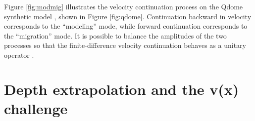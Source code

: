 \par
Figure \ref{fig:modmig} illustrates the velocity continuation process
on the Qdome synthetic model \cite[]{Claerbout.gem.97}, shown in Figure
\ref{fig:qdome}. Continuation backward in velocity corresponds to the
``modeling'' mode, while forward continuation corresponds to the
``migration'' mode. It is possible to balance the amplitudes of the
two processes so that the finite-difference velocity continuation
behaves as a unitary operator
\cite[]{Fomel.sep.92.159,Fomel.sep.92.267}.


\section{Depth extrapolation and the v(x) challenge}

